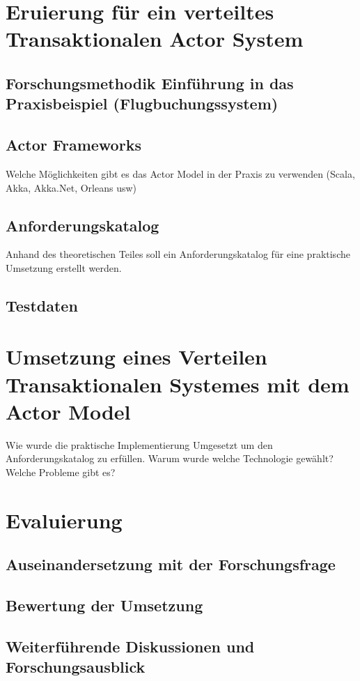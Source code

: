 
\chapter{Eruierung für ein verteiltes Transaktionalen Actor System }
\section{Forschungsmethodik Einführung in das Praxisbeispiel (Flugbuchungssystem)}
\section{Actor Frameworks}\label{sec:ActorFrameworks}
Welche Möglichkeiten gibt es das Actor Model in der Praxis zu verwenden (Scala, Akka, Akka.Net, Orleans usw)

\section{Anforderungskatalog}
Anhand des theoretischen Teiles soll ein Anforderungskatalog für eine praktische Umsetzung erstellt werden.

\section{Testdaten}

\chapter{Umsetzung eines Verteilen Transaktionalen Systemes mit dem Actor Model}
Wie wurde die praktische Implementierung Umgesetzt um den Anforderungskatalog zu erfüllen. Warum wurde welche Technologie gewählt? Welche Probleme gibt es? 

\chapter{Evaluierung}
\section{Auseinandersetzung mit der Forschungsfrage}
\section{Bewertung der Umsetzung}
\section{Weiterführende Diskussionen und Forschungsausblick}
